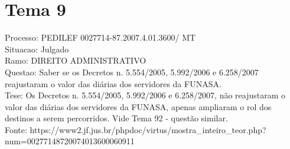 \documentclass[12pt]{article}
\begin{document}
\section*{Tema 9}
Processo: PEDILEF 0027714-87.2007.4.01.3600/ MT\\
Situacao: Julgado\\
Ramo: DIREITO ADMINISTRATIVO\\
Questao: Saber se os Decretos n. 5.554/2005, 5.992/2006 e 6.258/2007 reajustaram o valor das diárias dos servidores da FUNASA.\\
Tese: Os Decretos n. 5.554/2005, 5.992/2006 e 6.258/2007, não reajustaram o valor das diárias dos servidores da FUNASA, apenas ampliaram o rol dos destinos a serem percorridos. Vide Tema 92 - questão similar.\\
Fonte: https://www2.jf.jus.br/phpdoc/virtus/mostra\_inteiro\_teor.php?num=00277148720074013600060911
\end{document}
